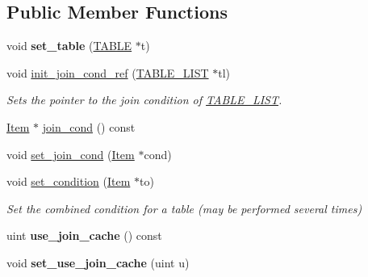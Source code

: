 \subsection*{Public Member Functions}
\begin{DoxyCompactItemize}
\item 
\mbox{\label{classJOIN__TAB_aa0a217df3532c76cee211d7e65dd86d0}} 
void {\bfseries set\+\_\+table} (\mbox{\hyperlink{structTABLE}{T\+A\+B\+LE}} $\ast$t)
\item 
\mbox{\label{classJOIN__TAB_a5ceb1154cde60c27cf304af914f6b5ba}} 
void \mbox{\hyperlink{classJOIN__TAB_a5ceb1154cde60c27cf304af914f6b5ba}{init\+\_\+join\+\_\+cond\+\_\+ref}} (\mbox{\hyperlink{structTABLE__LIST}{T\+A\+B\+L\+E\+\_\+\+L\+I\+ST}} $\ast$tl)
\begin{DoxyCompactList}\small\item\em Sets the pointer to the join condition of \mbox{\hyperlink{structTABLE__LIST}{T\+A\+B\+L\+E\+\_\+\+L\+I\+ST}}. \end{DoxyCompactList}\item 
\mbox{\hyperlink{classItem}{Item}} $\ast$ \mbox{\hyperlink{classJOIN__TAB_a7134d17d1d7755261a38029d07d98579}{join\+\_\+cond}} () const
\item 
void \mbox{\hyperlink{classJOIN__TAB_a883f00d9645b34b6a19785d8833013ff}{set\+\_\+join\+\_\+cond}} (\mbox{\hyperlink{classItem}{Item}} $\ast$cond)
\item 
\mbox{\label{classJOIN__TAB_a2438f83c84c9dbc9dcf7883c2939bca9}} 
void \mbox{\hyperlink{classJOIN__TAB_a2438f83c84c9dbc9dcf7883c2939bca9}{set\+\_\+condition}} (\mbox{\hyperlink{classItem}{Item}} $\ast$to)
\begin{DoxyCompactList}\small\item\em Set the combined condition for a table (may be performed several times) \end{DoxyCompactList}\item 
\mbox{\label{classJOIN__TAB_aef0b7fbf877c33e3d79c96c565d13bbf}} 
uint {\bfseries use\+\_\+join\+\_\+cache} () const
\item 
\mbox{\label{classJOIN__TAB_a5ed04ce038eaede290bdc0dca2d62996}} 
void {\bfseries set\+\_\+use\+\_\+join\+\_\+cache} (uint u)
\item 

\end{DoxyCompactItemize}
